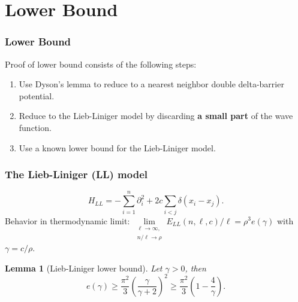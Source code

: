 \documentclass{beamer}[10]
\newtheorem{mlemma}{Lemma}
\begin{document}
\section{Lower Bound}

\begin{frame}
	\frametitle{Lower Bound}
	Proof of lower bound consists of the following steps:
	\begin{enumerate}
		\item Use Dyson's lemma to reduce to a nearest neighbor double delta-barrier potential.
		\item Reduce to the Lieb-Liniger model by discarding \textbf{a small part} of the wave function.
		\item Use a known lower bound for the Lieb-Liniger model.
	\end{enumerate}	
\end{frame}

\begin{frame}
	\frametitle{The Lieb-Liniger (LL) model}
	\begin{block}{}
	\begin{equation}
	H_{LL}=-\sum_{i=1}^{n}\partial_i^2+2c\sum_{i<j}\delta(x_i-x_j).
	\end{equation}
	Behavior in thermodynamic limit: $ \lim\limits_{\substack{\ell\to\infty,\\ n/\ell\to \rho}}E_{LL}(n,\ell,c)/\ell=\rho^3 e(\gamma) $ with $ \gamma=c/\rho  $.
		\begin{mlemma}[Lieb-Liniger lower bound] \label{LemmaLL-LowerBound}
			Let $ \gamma>0 $, then
			\begin{equation}
			e(\gamma)\geq \frac{\pi^2}{3}\left(\frac{\gamma}{\gamma+2}\right)^2\geq \frac{\pi^2}{3}\left(1-\frac{4}{\gamma}\right).
			\end{equation}
		\end{mlemma}
	\end{block}	
\end{frame}
\end{document}
